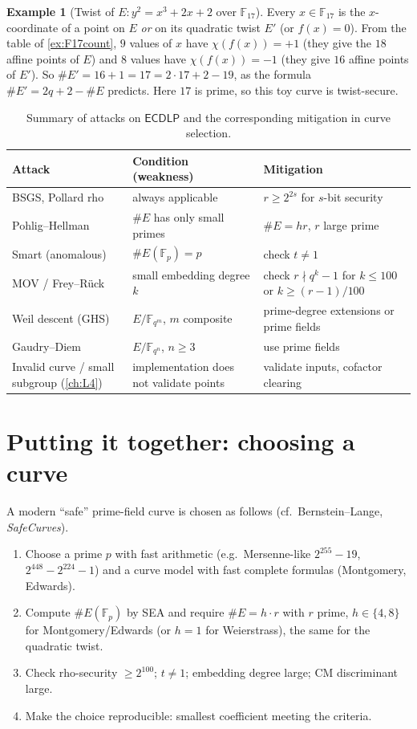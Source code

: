 \documentclass[11pt,a4paper,oneside]{book}
\theoremstyle{plain}
\theoremstyle{definition}
\newtheorem{example}[theorem]{Example}
\theoremstyle{remark}
\newcommand{\F}{\mathbb{F}}
\newcommand{\Fp}{\mathbb{F}_p}
\newcommand{\ECDLP}{\mathsf{ECDLP}}
\begin{document}
\begin{example}[Twist of $E:y^2=x^3+2x+2$ over $\F_{17}$]
Every $x\in\F_{17}$ is the $x$-coordinate of a point on $E$ \emph{or} on its quadratic twist $E'$ (or $f(x)=0$). From the table of \cref{ex:F17count}, $9$ values of $x$ have $\chi(f(x))=+1$ (they give the $18$ affine points of $E$) and $8$ values have $\chi(f(x))=-1$ (they give $16$ affine points of $E'$). So $\#E'=16+1=17=2\cdot17+2-19$, as the formula $\#E'=2q+2-\#E$ predicts. Here $17$ is prime, so this toy curve is twist-secure.
\end{example}

\begin{table}[ht]
\centering\small
\caption{Summary of attacks on $\ECDLP$ and the corresponding mitigation in curve selection.}
\begin{tabular}{@{}p{3.6cm}p{4.2cm}p{5.4cm}@{}}
\toprule
Attack & Condition (weakness) & Mitigation\\
\midrule
BSGS, Pollard rho & always applicable & $r\ge2^{2s}$ for $s$-bit security\\
Pohlig--Hellman & $\#E$ has only small primes & $\#E=hr$, $r$ large prime\\
Smart (anomalous) & $\#E(\Fp)=p$ & check $t\ne1$\\
MOV / Frey--R\"uck & small embedding degree $k$ & check $r\nmid q^k-1$ for $k\le100$ or $k\ge(r-1)/100$\\
Weil descent (GHS) & $E/\F_{q^m}$, $m$ composite & prime-degree extensions or prime fields\\
Gaudry--Diem & $E/\F_{q^n}$, $n\ge3$ & use prime fields\\
Invalid curve / small subgroup (\cref{ch:L4}) & implementation does not validate points & validate inputs, cofactor clearing\\
\bottomrule
\end{tabular}
\end{table}

\section{Putting it together: choosing a curve}\label{sec:choosing}

A modern ``safe'' prime-field curve is chosen as follows (cf.\ Bernstein--Lange, \emph{SafeCurves}).
\begin{enumerate}[nosep]
\item Choose a prime $p$ with fast arithmetic (e.g.\ Mersenne-like $2^{255}-19$, $2^{448}-2^{224}-1$) and a curve model with fast complete formulas (Montgomery, Edwards).
\item Compute $\#E(\Fp)$ by SEA and require $\#E=h\cdot r$ with $r$ prime, $h\in\{4,8\}$ for Montgomery/Edwards (or $h=1$ for Weierstrass), the same for the quadratic twist.
\item Check rho-security $\ge2^{100}$; $t\ne1$; embedding degree large; CM discriminant large.
\item Make the choice reproducible: smallest coefficient meeting the criteria.
\end{enumerate}
\end{document}
